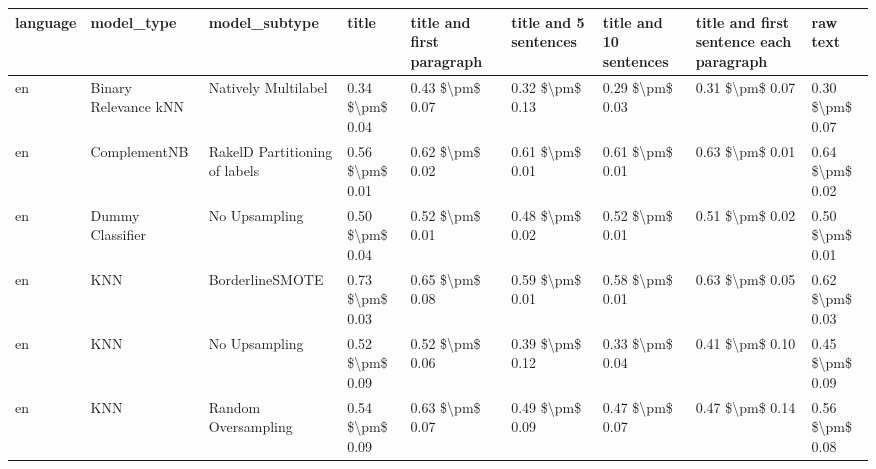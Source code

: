 \begin{tabular}{lllllllll}
\toprule
language &                      model\_type &                 model\_subtype &               title & title and first paragraph & title and 5 sentences & title and 10 sentences & title and first sentence each paragraph &            raw text \\
\midrule
      en &            Binary Relevance kNN &           Natively Multilabel &     0.34 \$\textbackslash pm\$ 0.04 &           0.43 \$\textbackslash pm\$ 0.07 &       0.32 \$\textbackslash pm\$ 0.13 &        0.29 \$\textbackslash pm\$ 0.03 &                         0.31 \$\textbackslash pm\$ 0.07 &     0.30 \$\textbackslash pm\$ 0.07 \\
      en &                    ComplementNB & RakelD Partitioning of labels &     0.56 \$\textbackslash pm\$ 0.01 &           0.62 \$\textbackslash pm\$ 0.02 &       0.61 \$\textbackslash pm\$ 0.01 &        0.61 \$\textbackslash pm\$ 0.01 &                         0.63 \$\textbackslash pm\$ 0.01 &     0.64 \$\textbackslash pm\$ 0.02 \\
      en &                Dummy Classifier &                 No Upsampling &     0.50 \$\textbackslash pm\$ 0.04 &           0.52 \$\textbackslash pm\$ 0.01 &       0.48 \$\textbackslash pm\$ 0.02 &        0.52 \$\textbackslash pm\$ 0.01 &                         0.51 \$\textbackslash pm\$ 0.02 &     0.50 \$\textbackslash pm\$ 0.01 \\
      en &                             KNN &               BorderlineSMOTE &     0.73 \$\textbackslash pm\$ 0.03 &           0.65 \$\textbackslash pm\$ 0.08 &       0.59 \$\textbackslash pm\$ 0.01 &        0.58 \$\textbackslash pm\$ 0.01 &                         0.63 \$\textbackslash pm\$ 0.05 &     0.62 \$\textbackslash pm\$ 0.03 \\
      en &                             KNN &                 No Upsampling &     0.52 \$\textbackslash pm\$ 0.09 &           0.52 \$\textbackslash pm\$ 0.06 &       0.39 \$\textbackslash pm\$ 0.12 &        0.33 \$\textbackslash pm\$ 0.04 &                         0.41 \$\textbackslash pm\$ 0.10 &     0.45 \$\textbackslash pm\$ 0.09 \\
      en &                             KNN &           Random Oversampling &     0.54 \$\textbackslash pm\$ 0.09 &           0.63 \$\textbackslash pm\$ 0.07 &       0.49 \$\textbackslash pm\$ 0.09 &        0.47 \$\textbackslash pm\$ 0.07 &                         0.47 \$\textbackslash pm\$ 0.14 &     0.56 \$\textbackslash pm\$ 0.08 \\

\end{tabular}
